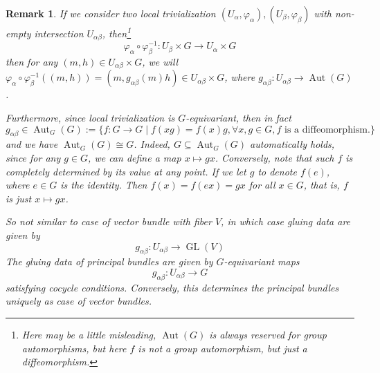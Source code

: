 \documentclass[11pt]{amsart}
\numberwithin{equation}{section}
\theoremstyle{plain}
\theoremstyle{plain}
\newtheorem{remksub}[thmsub]{Remark}
\numberwithin{equation}{section}
\begin{document}
\begin{remksub}\normalfont
If we consider two local trivialization $(U_{\alpha},\varphi_{\alpha}),(U_{\beta},\varphi_{\beta})$ with non-empty intersection $U_{\alpha\beta}$, then\footnote{Here may be a little misleading, $\operatorname{Aut}(G)$ is always reserved for group automorphisms, but here $f$ is not a group automorphism, but just a diffeomorphism.} 
$$
\varphi_{\alpha}\circ\varphi_{\beta}^{-1}:U_{\beta}\times G\to U_{\alpha}\times G
$$
then for any $(m,h)\in U_{\alpha\beta}\times G$, we will $\varphi_{\alpha}\circ\varphi_{\beta}^{-1}((m,h))=(m,g_{\alpha\beta}(m)h)\in U_{\alpha\beta}\times G$, where $g_{\alpha\beta}:U_{\alpha\beta}\to\operatorname{Aut}(G)$.
 
Furthermore, since local trivialization is $G$-equivariant, then in fact
$$
g_{\alpha\beta}\in\operatorname{Aut}_G(G):=\{f:G\to G\mid f(xg)=f(x)g,\forall x,g\in G,\text{$f$ is a diffeomorphism.}\}
$$
and we have $\operatorname{Aut}_G(G)\cong G$. Indeed, $G\subseteq\operatorname{Aut}_G(G)$ automatically holds, since for any $g\in G$, we can define a map $x\mapsto gx$. Conversely, note that such $f$ is completely determined by its value at any point. If we let $g$ to denote $f(e)$, where $e\in G$ is the identity. Then $f(x)=f(ex)=gx$ for all $x\in G$, that is, $f$ is just $x\mapsto gx$. 

So not similar to case of vector bundle with fiber $V$, in which case gluing data are given by
$$
g_{\alpha\beta}:U_{\alpha\beta}\to\operatorname{GL}(V)
$$ 
The gluing data of principal bundles are given by $G$-equivariant maps
$$
g_{\alpha\beta}:U_{\alpha\beta}\to G
$$
satisfying cocycle conditions. Conversely, this determines the principal bundles uniquely as case of vector bundles.
\end{remksub}
\end{document}
